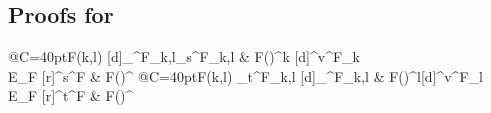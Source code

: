 \documentclass[3p]{elsarticle}
\theoremstyle{remark}
\theoremstyle{definition}
\begin{document}
\subsection{Proofs for }

\noindent 
\begin{minipage}[r]{.75\linewidth}
\equi*
\end{minipage}\hfill 
\begin{minipage}[l]{.25\linewidth}
	\xymatrix@R=10pt@C=40pt{F(k,l) \ar@{>->}[d]_{\iota^F_{k,l}}\ar[r]_{s^F_{k,l}} & F(\bullet)^k \ar@{>->}[d]^{v^F_k} \\ E_F ^{s^F} & F(\bullet)^\star}
	\xymatrix@R=10pt@C=40pt{F(k,l) \ar[r]_{t^F_{k,l}} \ar@{>->}[d]_{\iota^F_{k,l}} & F(\bullet)^l\ar@{>->}[d]^{v^F_l}  \\ E_F ^{t^F} & F(\bullet)^\star}
\end{minipage}
\end{document}
